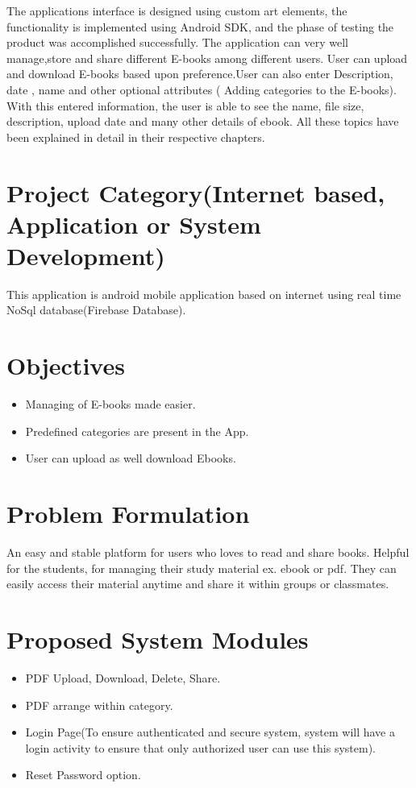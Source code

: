 The applications interface is designed using custom art elements, the functionality is implemented using Android SDK, and the phase of testing the product was accomplished successfully. The application can very well manage,store and share different E-books among different users. User can upload and download E-books based upon preference.User can also enter
Description, date , name  and other optional attributes ( Adding categories  to the E-books). With this entered information, the user is able to see the name, file size, description, upload date and many other details of ebook. All these topics have been explained in detail in their respective chapters.

\section{Project Category(Internet based, Application or System Development)}
This application is android mobile application based on internet using real time NoSql database(Firebase Database).

\section{Objectives}

\begin{itemize}
	\item Managing of E-books made easier.

	\item Predefined categories are present in the App.
	
	\item User can upload as well download Ebooks.


\end{itemize}

\section{Problem Formulation}
An easy and stable platform for users who loves to read and share books. Helpful for the students, for managing their study material ex. ebook or pdf. They can easily access their material anytime and share it within groups or classmates. 

\section{Proposed System Modules}

\begin{itemize}
	\item PDF Upload, Download, Delete, Share.

	\item PDF arrange within category.
	
	\item Login Page(To ensure authenticated and secure system, system will have a login activity to ensure that only authorized user can use this system).
	
	\item Reset Password option.
	


\end{itemize}

